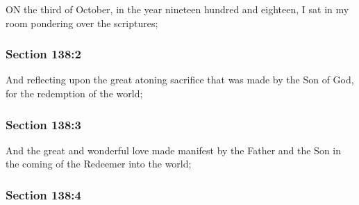 		ON the third of October, in the year nineteen hundred and eighteen, I sat in my room pondering over the scriptures;


	\subsubsection{Section 138:2} %
		\label{DC138-2}

		And reflecting upon the great atoning sacrifice that was made by the Son of God, for the redemption of the world;


	\subsubsection{Section 138:3} %
		\label{DC138-3}

		And the great and wonderful love made manifest by the Father and the Son in the coming of the Redeemer into the world;


	\subsubsection{Section 138:4} %
		\label{DC138-4}

